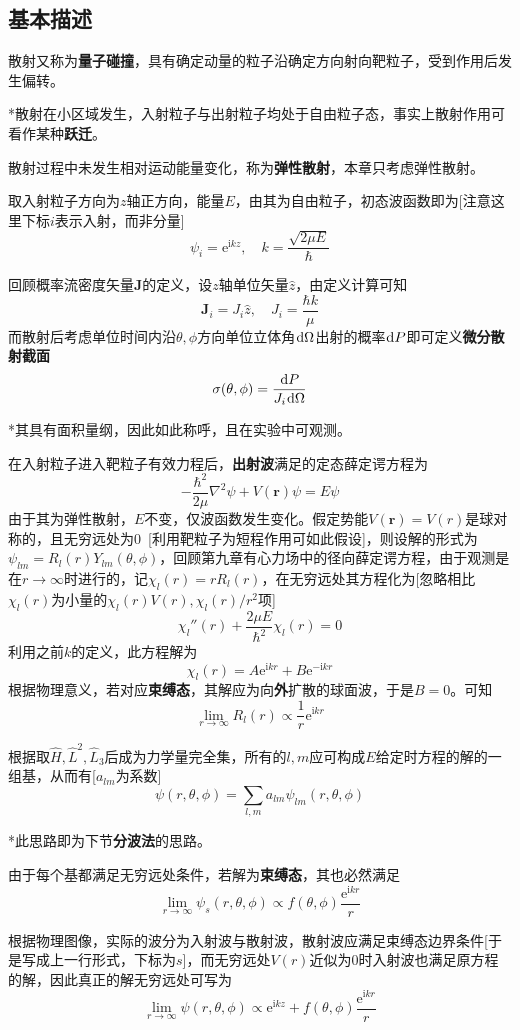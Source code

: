 \documentclass[a4paper,UTF8,fontset=windows]{ctexart}
\newcommand*{\dr}{\hspace{0.07em}\mathrm{d}}
\newcommand*{\ir}{\mathrm{i}}
\newcommand*{\er}{\mathrm{e}}
\newcommand*{\br}{\mathbf{r}}
\newcommand*{\bj}{\mathbf{J}}
\begin{document}
\subsection{基本描述}
散射又称为\textbf{量子碰撞}，具有确定动量的粒子沿确定方向射向靶粒子，受到作用后发生偏转。

*散射在小区域发生，入射粒子与出射粒子均处于自由粒子态，事实上散射作用可看作某种\textbf{跃迁}。

散射过程中未发生相对运动能量变化，称为\textbf{弹性散射}，本章只考虑弹性散射。

取入射粒子方向为$z$轴正方向，能量$E$，由其为自由粒子，初态波函数即为[注意这里下标$i$表示入射，而非分量]
$$\psi_i=\er^{\ir kz},\quad k=\frac{\sqrt{2\mu E}}{\hbar}$$

回顾概率流密度矢量$\bj$的定义，设$z$轴单位矢量$\hat{z}$，由定义计算可知
$$\bj_i=J_i\hat{z},\quad J_i=\frac{\hbar k}{\mu}$$
而散射后考虑单位时间内沿$\theta,\phi$方向单位立体角$\dr\Omega$出射的概率$\dr P$即可定义\textbf{微分散射截面}
$$\sigma(\theta,\phi)=\frac{\dr P}{J_i\dr\Omega}$$

*其具有面积量纲，因此如此称呼，且在实验中可观测。

在入射粒子进入靶粒子有效力程后，\textbf{出射波}满足的定态薛定谔方程为
$$-\frac{\hbar^2}{2\mu}\nabla^2\psi+V(\br)\psi=E\psi$$
由于其为弹性散射，$E$不变，仅波函数发生变化。假定势能$V(\br)=V(r)$是球对称的，且无穷远处为0\ [利用靶粒子为短程作用可如此假设]，则设解的形式为$\psi_{lm}=R_l(r)Y_{lm}(\theta,\phi)$，回顾第九章有心力场中的径向薛定谔方程，由于观测是在$r\to\infty$时进行的，记$\chi_l(r)=rR_l(r)$，在无穷远处其方程化为[忽略相比$\chi_l(r)$为小量的$\chi_l(r)V(r),\chi_l(r)/r^2$项]
$$\chi_l''(r)+\frac{2\mu E}{\hbar^2}\chi_l(r)=0$$
利用之前$k$的定义，此方程解为
$$\chi_l(r)=A\er^{\ir kr}+B\er^{-\ir kr}$$
根据物理意义，若对应\textbf{束缚态}，其解应为向\textbf{外}扩散的球面波，于是$B=0$。可知
$$\lim_{r\to\infty}R_l(r)\propto\frac{1}{r}\er^{\ir kr}$$

根据取$\hat{H},\hat{L}^2,\hat{L}_3$后成为力学量完全集，所有的$l,m$应可构成$E$给定时方程的解的一组基，从而有[$a_{lm}$为系数]
$$\psi(r,\theta,\phi)=\sum_{l,m}a_{lm}\psi_{lm}(r,\theta,\phi)$$

*此思路即为下节\textbf{分波法}的思路。

由于每个基都满足无穷远处条件，若解为\textbf{束缚态}，其也必然满足
$$\lim_{r\to\infty}\psi_s(r,\theta,\phi)\propto f(\theta,\phi)\frac{\er^{\ir kr}}{r}$$

根据物理图像，实际的波分为入射波与散射波，散射波应满足束缚态边界条件[于是写成上一行形式，下标为$s$]，而无穷远处$V(r)$近似为0时入射波也满足原方程的解，因此真正的解无穷远处可写为
$$\lim_{r\to\infty}\psi(r,\theta,\phi)\propto\er^{\ir kz}+f(\theta,\phi)\frac{\er^{\ir kr}}{r}$$
\end{document}
